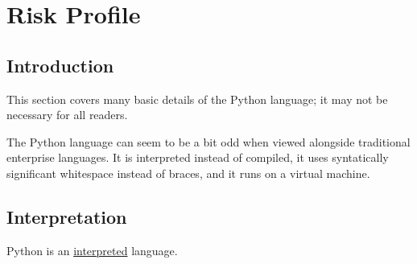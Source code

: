 \section{Risk Profile}

\subsection{Introduction}

\begin{tcolorbox}
	This section covers many basic details of the Python language; it may not be necessary for all readers.
\end{tcolorbox}

The Python language can seem to be a bit odd when viewed alongside traditional enterprise languages. It is interpreted instead of compiled, it uses syntatically significant whitespace instead of braces, and it runs on a virtual machine.

\subsection{Interpretation}
	Python is an \href{https://en.wikipedia.org/wiki/Interpreted_language}{interpreted} language.
